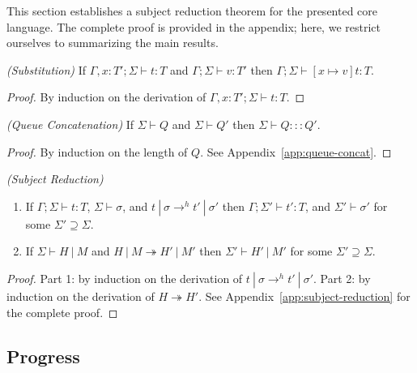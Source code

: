 This section establishes a subject reduction theorem for the presented
core language. The complete proof is provided in the appendix; here,
we restrict ourselves to summarizing the main results.

\begin{lem}
\emph{(Substitution)}\label{th:subst}
If $\Gamma , x : T' ; \Sigma \vdash t : T$ and $\Gamma ; \Sigma \vdash v : T'$ then $\Gamma ; \Sigma \vdash [x \mapsto v]t : T$.
\end{lem}
\begin{proof}
By induction on the derivation of $\Gamma , x : T' ; \Sigma \vdash t : T$.
\end{proof}

\begin{lem}
\emph{(Queue Concatenation)}\label{lem:queue-concat}
If $\Sigma \vdash Q$ and $\Sigma \vdash Q'$ then $\Sigma \vdash Q ::: Q'$.
\end{lem}
\begin{proof}
By induction on the length of $Q$. See Appendix~\ref{app:queue-concat}.
\end{proof}


\begin{thm}
\emph{(Subject Reduction)}\label{th:subject-reduction}

\begin{enumerate}

\item If $\Gamma ; \Sigma \vdash t : T$, $\Sigma \vdash \sigma$, and $t~|~\sigma \rightarrow^h t'~|~\sigma'$ then $\Gamma ; \Sigma' \vdash t' : T$, and $\Sigma' \vdash \sigma'$ for some $\Sigma' \supseteq \Sigma$.

\item If $\Sigma \vdash H~|~M$ and $H~|~M \twoheadrightarrow H'~|~M'$ then $\Sigma' \vdash H'~|~M'$ for some $\Sigma' \supseteq \Sigma$.

\end{enumerate}

\end{thm}
\begin{proof}
  Part 1: by induction on the derivation of $t~|~\sigma \rightarrow^h
  t'~|~\sigma'$. Part 2: by induction on the derivation of $H
  \twoheadrightarrow H'$. See Appendix~\ref{app:subject-reduction} for
  the complete proof.
\end{proof}


\subsection{Progress}\label{sec:progress}

